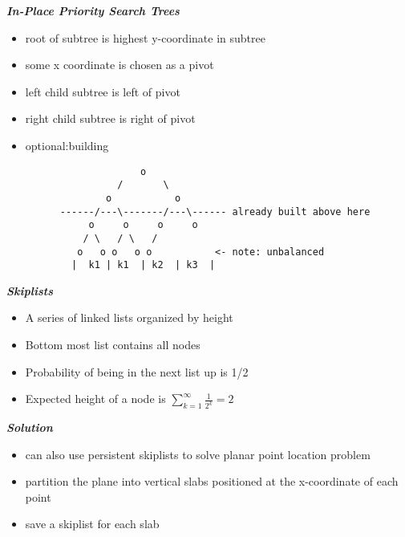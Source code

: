 \documentclass{article}
\begin{document}
{\bf\em In-Place Priority Search Trees}

\begin{itemize}
\item
  root of subtree is highest y-coordinate in subtree
\item
  some x coordinate is chosen as a pivot
\item
  left child subtree is left of pivot
\item
  right child subtree is right of pivot
\item
  optional:building
\begin{verbatim}
	                o
	            /       \ 
	          o           o
	  ------/---\-------/---\------ already built above here
	       o     o     o     o
	      / \   / \   /
	     o   o o   o o           <- note: unbalanced
	    |  k1 | k1  | k2  | k3  |
\end{verbatim}
\end{itemize}

{\bf\em Skiplists}
\begin{itemize}
\item
  A series of linked lists organized by height
\item
  Bottom most list contains all nodes
\item
  Probability of being in the next list up is 1/2
\item
  Expected height of a node is $\sum\limits_{k = 1}^\infty {\frac{1}{2^k}}=2$
\end{itemize}

{\bf\em Solution}

\begin{itemize}
\item
  can also use persistent skiplists to solve planar point location problem
\item
  partition the plane into vertical slabs positioned at the x-coordinate of
  each point
\item
  save a skiplist for each slab
\end{itemize}
\end{document}
